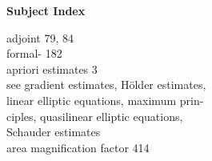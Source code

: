 \begin{flushleft}
\textbf{Subject Index}

\vspace{2.4em}

adjoint \hspace{1em} 79, 84\\
formal- \hspace{1em} 182\\
apriori estimates \hspace{1em} 3\\
\hspace*{1.5em} see gradient estimates, Hölder estimates,\\
\hspace*{1.5em} linear elliptic equations, maximum prin-\\
\hspace*{1.5em} ciples, quasilinear elliptic equations,\\
\hspace*{1.5em} Schauder estimates\\
area magnification factor \hspace{1em} 414\\[1.8em]


\end{flushleft}
